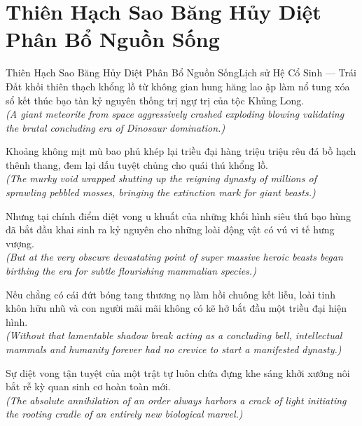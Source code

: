 \section{Thiên Hạch Sao Băng Hủy Diệt Phân Bổ Nguồn Sống}
\begin{truyen}{Thiên Hạch Sao Băng Hủy Diệt Phân Bổ Nguồn Sống}{Lịch sử Hệ Cổ Sinh --- Trái Đất}
 khối thiên thạch khổng lồ từ không gian hung hăng lao ập làm nổ tung xóa sổ kết thúc bạo tàn kỷ nguyên thống trị ngự trị của tộc Khủng Long.\\[4pt]
\textit{(A giant meteorite from space aggressively crashed exploding blowing validating the brutal concluding era of Dinosaur domination.)}

Khoảng không mịt mù bao phủ khép lại triều đại hàng triệu triệu rêu đá bồ hạch thênh thang, đem lại dấu tuyệt chủng cho quái thú khổng lồ.\\[4pt]
\textit{(The murky void wrapped shutting up the reigning dynasty of millions of sprawling pebbled mosses, bringing the extinction mark for giant beasts.)}

Nhưng tại chính điểm diệt vong u khuất của những khối hình siêu thú bạo hùng đã bắt đầu khai sinh ra kỷ nguyên cho những loài động vật có vú vi tế hưng vượng.\\[4pt]
\textit{(But at the very obscure devastating point of super massive heroic beasts began birthing the era for subtle flourishing mammalian species.)}

Nếu chẳng có cái đứt bóng tang thương nọ làm hồi chuông kết liễu, loài tinh khôn hữu nhũ và con người mãi mãi không có kẽ hở bắt đầu một triều đại hiện hình.\\[4pt]
\textit{(Without that lamentable shadow break acting as a concluding bell, intellectual mammals and humanity forever had no crevice to start a manifested dynasty.)}

\end{truyen}
\begin{baihoc}
  Sự diệt vong tận tuyệt của một trật tự luôn chứa đựng khe sáng khởi xướng nôi bắt rễ kỳ quan sinh cơ hoàn toàn mới.\\[4pt]
  \textit{(The absolute annihilation of an order always harbors a crack of light initiating the rooting cradle of an entirely new biological marvel.)}
\end{baihoc}

